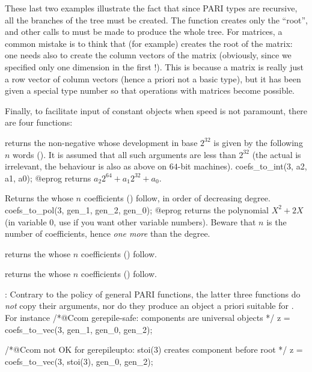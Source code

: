 These last two examples illustrate the fact that since PARI types are
recursive, all the branches of the tree must be created. The function
 creates only the ``root'', and other calls to  must be
made to produce the whole tree. For matrices, a common mistake is to think
that  (for example) creates the root of the
matrix: one needs also to create the column vectors of the matrix (obviously,
since we specified only one dimension in the first !). This is
because a matrix is really just a row vector of column vectors (hence a
priori not a basic type), but it has been given a special type number so that
operations with matrices become possible.

Finally, to facilitate input of constant objects when speed is not paramount,
there are four  functions:

returns the non-negative  whose development in base $2^{32}$
is given by the following $n$ words (). It is assumed that
all such arguments are less than $2^{32}$ (the actual  is
irrelevant, the behaviour is also as above on $64$-bit machines).
\bprog
  coefs_to_int(3, a2, a1, a0);
@eprog
\noindent returns $a_2 2^{64} + a_1 2^{32} + a_0$.

Returns the  whose $n$ coefficients () follow, in order of
decreasing degree.
\bprog
  coefs_to_pol(3, gen_1, gen_2, gen_0);
@eprog
\noindent returns the polynomial $X^2 + 2X$ (in variable $0$, use
 if you want other variable numbers). Beware that $n$ is the
number of coefficients, hence \emph{one more} than the degree.

returns the  whose $n$ coefficients () follow.

returns the  whose $n$ coefficients () follow.

: Contrary to the policy of general PARI functions, the
latter three functions do \emph{not} copy their arguments, nor do they produce
an object a priori suitable for . For instance
\bprog
  /*@Ccom gerepile-safe: components are universal objects */
  z = coefs_to_vec(3, gen_1, gen_0, gen_2);

  /*@Ccom not OK for gerepileupto: stoi(3) creates component before root */
  z = coefs_to_vec(3, stoi(3), gen_0, gen_2);

